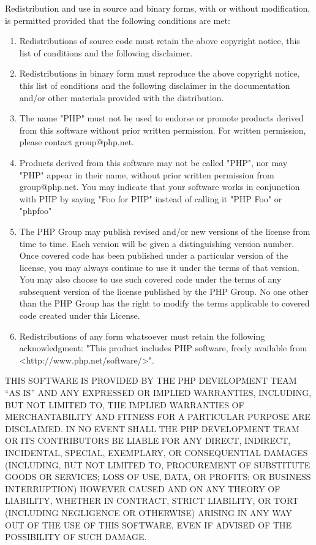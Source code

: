 \documentclass[oneside, openany, 12pt]{tufte-book}
\newcommand{\licensetext}{\scriptsize \setlength{\parskip}{0mm} \singlespacing}
\begin{document}
{\licensetext Redistribution and use in source and binary forms, with or without
modification, is permitted provided that the following conditions
are met:
\begin{enumerate}
\item Redistributions of source code must retain the above copyright
notice, this list of conditions and the following disclaimer.

\item Redistributions in binary form must reproduce the above copyright
notice, this list of conditions and the following disclaimer in
the documentation and/or other materials provided with the
distribution.

\item The name "PHP" must not be used to endorse or promote products
derived from this software without prior written permission. For
written permission, please contact group@php.net.

\item Products derived from this software may not be called "PHP", nor
may "PHP" appear in their name, without prior written permission
from group@php.net.  You may indicate that your software works in
conjunction with PHP by saying "Foo for PHP" instead of calling
it "PHP Foo" or "phpfoo"

\item The PHP Group may publish revised and/or new versions of the
license from time to time. Each version will be given a
distinguishing version number.
Once covered code has been published under a particular version
of the license, you may always continue to use it under the terms
of that version. You may also choose to use such covered code
under the terms of any subsequent version of the license
published by the PHP Group. No one other than the PHP Group has
the right to modify the terms applicable to covered code created
under this License.

\item Redistributions of any form whatsoever must retain the following
acknowledgment:
"This product includes PHP software, freely available from
<http://www.php.net/software/>".
\end{enumerate}

THIS SOFTWARE IS PROVIDED BY THE PHP DEVELOPMENT TEAM ``AS IS'' AND 
ANY EXPRESSED OR IMPLIED WARRANTIES, INCLUDING, BUT NOT LIMITED TO,
THE IMPLIED WARRANTIES OF MERCHANTABILITY AND FITNESS FOR A 
PARTICULAR PURPOSE ARE DISCLAIMED.  IN NO EVENT SHALL THE PHP
DEVELOPMENT TEAM OR ITS CONTRIBUTORS BE LIABLE FOR ANY DIRECT, 
INDIRECT, INCIDENTAL, SPECIAL, EXEMPLARY, OR CONSEQUENTIAL DAMAGES 
(INCLUDING, BUT NOT LIMITED TO, PROCUREMENT OF SUBSTITUTE GOODS OR 
SERVICES; LOSS OF USE, DATA, OR PROFITS; OR BUSINESS INTERRUPTION)
HOWEVER CAUSED AND ON ANY THEORY OF LIABILITY, WHETHER IN CONTRACT,
STRICT LIABILITY, OR TORT (INCLUDING NEGLIGENCE OR OTHERWISE)
ARISING IN ANY WAY OUT OF THE USE OF THIS SOFTWARE, EVEN IF ADVISED
OF THE POSSIBILITY OF SUCH DAMAGE.}
\end{document}
